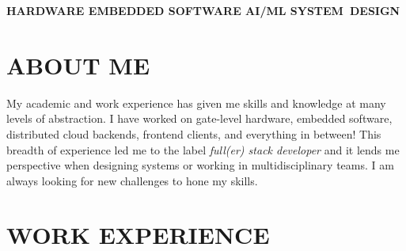 \documentclass[a4paper,nocolors]{cv-friggeri-ben}
\begin{document}

\vspace{-1em}\hspace{-4.33cm}
\textbf{\large{%
\hfill HARDWARE \hfill {\small\textbullet}%
\hfill EMBEDDED \hfill {\small\textbullet}%
\hfill SOFTWARE \hfill {\small\textbullet}%
\hfill AI/ML \hfill {\small\textbullet}%
\hfill SYSTEM~DESIGN \hfill%
}}%

\vspace{-1ex}\hspace{-4.33cm}\hrulefill


\vspace{-2pt}
\section{ABOUT ME}

My academic and work experience has given me skills and knowledge at many levels
of abstraction. I have worked on gate-level hardware, embedded software,
distributed cloud backends, frontend clients, and everything in between! This
breadth of experience led me to the label \emph{full(er) stack developer} and it
lends me perspective when designing systems or working in multidisciplinary
teams. I am always looking for new challenges to hone my skills.



\section{WORK EXPERIENCE}
\end{document}
